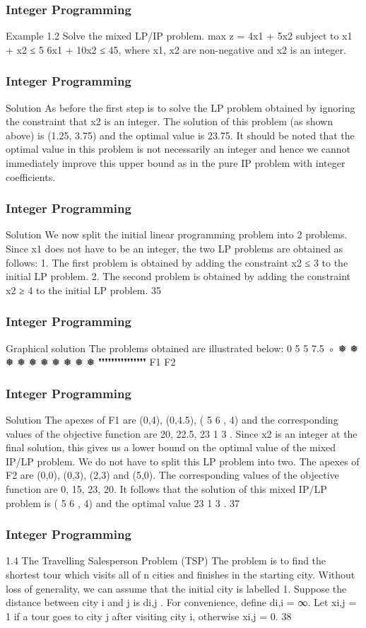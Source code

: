 \begin{frame} 
\frametitle{Integer Programming}     
Example 1.2
Solve the mixed LP/IP problem.
max z = 4x1 + 5x2
subject to
x1 + x2 ≤ 5
6x1 + 10x2 ≤ 45,
where x1, x2 are non-negative and x2 is an integer.
\end{frame}  
\begin{frame} 
\frametitle{Integer Programming}     
Solution
As before the first step is to solve the LP problem obtained by
ignoring the constraint that x2 is an integer. The solution of this
problem (as shown above) is (1.25, 3.75) and the optimal value is
23.75.
It should be noted that the optimal value in this problem is not
necessarily an integer and hence we cannot immediately improve
this upper bound as in the pure IP problem with integer
coefficients.
\end{frame}  
\begin{frame} 
\frametitle{Integer Programming}     
Solution
We now split the initial linear programming problem into 2
problems. Since x1 does not have to be an integer, the two LP
problems are obtained as follows:
1. The first problem is obtained by adding the
constraint x2 ≤ 3 to the initial LP problem.
2. The second problem is obtained by adding the
constraint x2 ≥ 4 to the initial LP problem.
35 \end{frame}  \begin{frame} \frametitle{Integer Programming}     
Graphical solution
The problems obtained are illustrated below:
0
5
5 7.5
◦
❅
❅
❅
❅
❅
❅
❅
❅
❅
❅
❜❜❜❜❜❜❜❜❜❜❜❜❜❜❜
F1
F2
\end{frame}  
\begin{frame} 
\frametitle{Integer Programming}     
Solution
The apexes of F1 are (0,4), (0,4.5), ( 5
6
, 4) and the corresponding
values of the objective function are 20, 22.5, 23 1
3
.
Since x2 is an integer at the final solution, this gives us a lower
bound on the optimal value of the mixed IP/LP problem. We do
not have to split this LP problem into two.
The apexes of F2 are (0,0), (0,3), (2,3) and (5,0). The
corresponding values of the objective function are 0, 15, 23, 20. It
follows that the solution of this mixed IP/LP problem is ( 5
6
, 4) and
the optimal value 23 1
3
.
37 \end{frame}  \begin{frame} \frametitle{Integer Programming}     
1.4 The Travelling Salesperson Problem (TSP)
The problem is to find the shortest tour which visits all of n cities
and finishes in the starting city.
Without loss of generality, we can assume that the initial city is
labelled 1.
Suppose the distance between city i and j is di,j
. For convenience,
define di,i = ∞.
Let xi,j = 1 if a tour goes to city j after visiting city i, otherwise
xi,j = 0.
38 \end{frame}  
